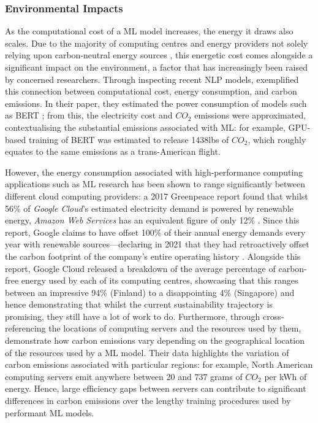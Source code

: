 \documentclass[a4paper, 12pt]{article}
\begin{document}
    \subsubsection{Environmental Impacts}

    As the computational cost of a ML model increases, the energy it draws also scales. Due to the majority of computing centres and energy providers not solely relying upon carbon-neutral energy sources \citep{strubell-2019}, this energetic cost comes alongside a significant impact on the environment, a factor that has increasingly been raised by concerned researchers. Through inspecting recent NLP models, \citet{strubell-2019} exemplified this connection between computational cost, energy consumption, and carbon emissions. In their paper, they estimated the power consumption of models such as BERT \citep{devlin-2019}; from this, the electricity cost and $CO_2$ emissions were approximated, contextualising the substantial emissions associated with ML: for example, GPU-based training of BERT was estimated to release 1438lbs of $CO_2$, which roughly equates to the same emissions as a trans-American flight.

    However, the energy consumption associated with high-performance computing applications such as ML research has been shown to range significantly between different cloud computing providers: a 2017 Greenpeace report found that whilst 56\% of \emph{Google Cloud}'s estimated electricity demand is powered by renewable energy, \emph{Amazon Web Services} has an equivalent figure of only 12\% \citep{cook-2017}. Since this report, Google claims to have offset 100\% of their annual energy demands every year with renewable sources---declaring in 2021 that they had retroactively offset the carbon footprint of the company's entire operating history \citep{google-2021}. Alongside this report, Google Cloud released a breakdown of the average percentage of carbon-free energy used by each of its computing centres, showcasing that this ranges between an impressive 94\% (Finland) to a disappointing 4\% (Singapore) and hence demonstrating that whilst the current sustainability trajectory is promising, they still have a lot of work to do. Furthermore, through cross-referencing the locations of computing servers and the resources used by them, \citet{lacoste-2019} demonstrate how carbon emissions vary depending on the geographical location of the resources used by a ML model. Their data highlights the variation of carbon emissions associated with particular regions: for example, North American computing servers emit anywhere between 20 and 737 grams of $CO_2$ per kWh of energy. Hence, large efficiency gaps between servers can contribute to significant differences in carbon emissions over the lengthy training procedures used by performant ML models.
\end{document}
